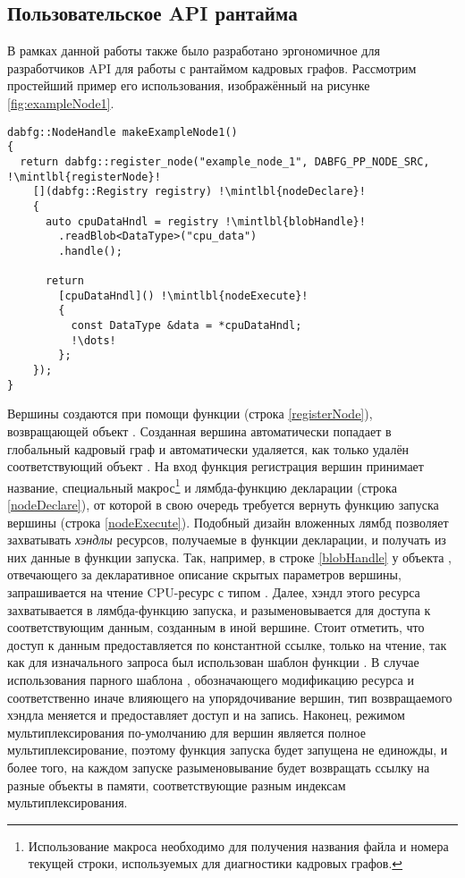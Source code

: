 \subsection{Пользовательское API рантайма}
В рамках данной работы также было разработано эргономичное для разработчиков API для работы с рантаймом кадровых графов. Рассмотрим простейший пример его использования, изображённый на рисунке \ref{fig:exampleNode1}.
\begin{figure*}
\begin{verbatim}
dabfg::NodeHandle makeExampleNode1()
{
  return dabfg::register_node("example_node_1", DABFG_PP_NODE_SRC, !\mintlbl{registerNode}!
    [](dabfg::Registry registry) !\mintlbl{nodeDeclare}!
    {
      auto cpuDataHndl = registry !\mintlbl{blobHandle}!
        .readBlob<DataType>("cpu_data")
        .handle();

      return
        [cpuDataHndl]() !\mintlbl{nodeExecute}!
        {
          const DataType &data = *cpuDataHndl;
          !\dots!
        };
    });
}
\end{verbatim}
\caption{Листинг элементарного примера использования разработанного API.}
\label{fig:exampleNode1}
\end{figure*}
Вершины создаются при помощи функции  (строка \ref{registerNode}), возвращающей объект .
Созданная вершина автоматически попадает в глобальный кадровый граф и автоматически удаляется, как только удалён соответствующий объект .
На вход функция регистрация вершин принимает название, специальный макрос\footnote{Использование макроса необходимо для получения названия файла и номера текущей строки, используемых для диагностики кадровых графов.} и лямбда-функцию декларации (строка \ref{nodeDeclare}), от которой в свою очередь требуется вернуть функцию запуска вершины (строка \ref{nodeExecute}).
Подобный дизайн вложенных лямбд позволяет захватывать \textit{хэндлы} ресурсов, получаемые в функции декларации, и получать из них данные в функции запуска.
Так, например, в строке \ref{blobHandle} у объекта , отвечающего за декларативное описание скрытых параметров вершины, запрашивается на чтение CPU-ресурс  с типом .
Далее, хэндл этого ресурса захватывается в лямбда-функцию запуска, и разыменовывается для доступа к соответствующим данным, созданным в иной вершине.
Стоит отметить, что доступ к данным предоставляется по константной ссылке, только на чтение, так как для изначального запроса был использован шаблон функции .
В случае использования парного шаблона , обозначающего модификацию ресурса и соответственно иначе влияющего на упорядочивание вершин, тип возвращаемого хэндла меняется и предоставляет доступ и на запись.
Наконец, режимом мультиплексирования по-умолчанию для вершин является полное мультиплексирование, поэтому функция запуска будет запущена не единожды, и более того, на каждом запуске разыменовывание  будет возвращать ссылку на разные объекты в памяти, соответствующие разным индексам мультиплексирования.

